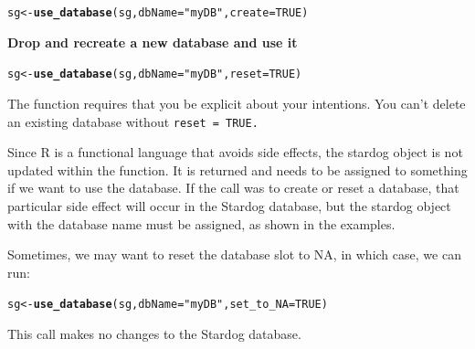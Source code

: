 \documentclass{article}\usepackage[]{graphicx}\usepackage[]{xcolor}
\makeatletter
\newcommand{\hlnum}[1]{\textcolor[rgb]{0.686,0.059,0.569}{#1}}%
\newcommand{\hlstr}[1]{\textcolor[rgb]{0.192,0.494,0.8}{#1}}%
\newcommand{\hlstd}[1]{\textcolor[rgb]{0.345,0.345,0.345}{#1}}%
\newcommand{\hlkwb}[1]{\textcolor[rgb]{0.69,0.353,0.396}{#1}}%
\newcommand{\hlkwc}[1]{\textcolor[rgb]{0.333,0.667,0.333}{#1}}%
\newcommand{\hlkwd}[1]{\textcolor[rgb]{0.737,0.353,0.396}{\textbf{#1}}}%
\newenvironment{kframe}{%
 \def\at@end@of@kframe{}%
 \ifinner\ifhmode%
  \def\at@end@of@kframe{\end{minipage}}%
  \begin{minipage}{\columnwidth}%
 \fi\fi%
 \def\FrameCommand##1{\hskip\@totalleftmargin \hskip-\fboxsep
 \colorbox{shadecolor}{##1}\hskip-\fboxsep
     \hskip-\linewidth \hskip-\@totalleftmargin \hskip\columnwidth}%
 \MakeFramed {\advance\hsize-\width
   \@totalleftmargin\z@ \linewidth\hsize
   \@setminipage}}%
 {\par\unskip\endMakeFramed%
 \at@end@of@kframe}
\newenvironment{knitrout}{}{} %
\makeatother
\begin{document}
\begin{knitrout}
\color{fgcolor}\begin{kframe}
\begin{alltt}
\hlstd{sg} \hlkwb{<-} \hlkwd{use_database}\hlstd{(sg,} \hlkwc{dbName} \hlstd{=} \hlstr{"myDB"}\hlstd{,} \hlkwc{create} \hlstd{=} \hlnum{TRUE}\hlstd{)}
\end{alltt}
\end{kframe}
\end{knitrout}

\bf{Drop and recreate a new database and use it}

\begin{knitrout}
\color{fgcolor}\begin{kframe}
\begin{alltt}
\hlstd{sg} \hlkwb{<-} \hlkwd{use_database}\hlstd{(sg,} \hlkwc{dbName} \hlstd{=} \hlstr{"myDB"}\hlstd{,} \hlkwc{reset} \hlstd{=} \hlnum{TRUE}\hlstd{)}
\end{alltt}
\end{kframe}
\end{knitrout}

The function requires that you be explicit about your intentions. You can't delete an existing database without \tt{reset = TRUE}.

Since R is a functional language that avoids side effects, the stardog object is not updated within the function. It is returned and needs to be assigned to something if we want to use the database. If the call was to create or reset a database, that particular side effect will occur in the Stardog database, but the stardog object with the database name must be assigned, as shown in the examples.

Sometimes, we may want to reset the database slot to NA, in which case, we can run:

\begin{knitrout}
\color{fgcolor}\begin{kframe}
\begin{alltt}
\hlstd{sg} \hlkwb{<-} \hlkwd{use_database}\hlstd{(sg,} \hlkwc{dbName} \hlstd{=} \hlstr{"myDB"}\hlstd{,} \hlkwc{set_to_NA} \hlstd{=} \hlnum{TRUE}\hlstd{)}
\end{alltt}
\end{kframe}
\end{knitrout}

This call makes no changes to the Stardog database.
\end{document}
